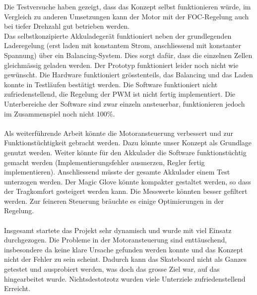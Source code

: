 Die Testversuche haben gezeigt, dass das Konzept selbst funktionieren würde, im Vergleich zu anderen Umsetzungen kann der Motor mit der FOC-Regelung auch bei tiefer Drehzahl gut betrieben werden. \\
Das selbstkonzipierte Akkuladegerät funktioniert neben der grundlegenden Laderegelung (erst laden mit konstantem Strom, anschliessend mit konstanter Spannung) über ein Balancing-System. Dies sorgt dafür, dass die einzelnen Zellen gleichmässig geladen werden. Der Prototyp funktioniert leider noch nicht wie gewünscht. Die Hardware funktioniert grösstenteils, das Balancing und das Laden konnte in Testläufen bestätigt werden. Die Software funktioniert nicht zufriedenstellend, die Regelung der PWM ist nicht fertig implementiert. Die Unterbereiche der Software sind zwar einzeln ansteuerbar, funktionieren jedoch im Zusammenspiel noch nicht 100\%. \\
\\
Als weiterführende Arbeit könnte die Motoransteuerung verbessert und zur Funktionstüchtigkeit gebracht werden. Dazu könnte unser Konzept als Grundlage genutzt werden. Weiter könnte für den Akkulader die Software funktionstüchtig gemacht werden (Implementierungsfehler ausmerzen, Regler fertig implementieren). Anschliessend müsste der gesamte Akkulader einem Test unterzogen werden.
Der Magic Glove könnte kompakter gestaltet werden, so dass der Tragkomfort gesteigert werden kann. Die Messwerte könnten besser gefiltert werden. Zur feineren Steuerung bräuchte es einige Optimierungen in der Regelung.\\
\\
Insgesamt startete das Projekt sehr dynamisch und wurde mit viel Einsatz durchgezogen. Die Probleme in der Motoransteuerung sind enttäuschend, insbesondere da keine klare Ursache gefunden werden konnte und das Konzept nicht der Fehler zu sein scheint. Dadurch kann das Skateboard nicht als Ganzes getestet und ausprobiert werden, was doch das grosse Ziel war, auf das hingearbeitet wurde. Nichtsdestotrotz wurden viele Unterziele zufriedenstellend Erreicht.